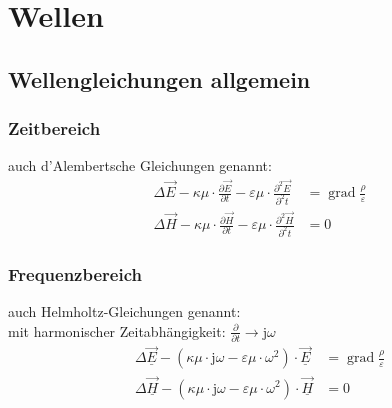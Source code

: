 \section{Wellen}

%
%
%
%
%

\subsection{Wellengleichungen allgemein}
\subsubsection{Zeitbereich}
auch d'Alembertsche Gleichungen genannt:
\begin{align*}
	\Delta \vec{E} -\kappa \mu \cdot \frac{\partial \vec{E}}{\partial t}-\varepsilon \mu \cdot \frac{\partial^2 \vec{E}}{\partial^2 t}& = \operatorname{grad} \frac{\rho}{\varepsilon} \\
	\Delta \vec{H} -\kappa \mu \cdot \frac{\partial \vec{H}}{\partial t}-\varepsilon \mu \cdot \frac{\partial^2 \vec{H}}{\partial^2 t}& = 0
\end{align*}
\subsubsection{Frequenzbereich}
auch Helmholtz-Gleichungen genannt:\\
mit harmonischer Zeitabhängigkeit: $ \frac{\partial }{\partial t} \rightarrow \mathrm{j}\omega $
\begin{align*}
	\Delta \underline{\vec{E}}-\left(\kappa \mu \cdot \mathrm{j} \omega-\varepsilon \mu \cdot \omega^{2}\right) \cdot \underline{\vec{E}} & = \operatorname{grad} \frac{\rho}{\varepsilon} \\
	\Delta \underline{\vec{H}}-\left(\kappa \mu \cdot \mathrm{j} \omega-\varepsilon \mu \cdot \omega^{2}\right) \cdot \underline{\vec{H}} & = 0
\end{align*}

